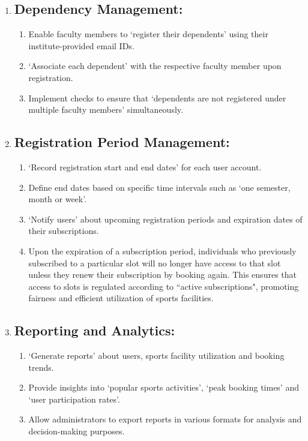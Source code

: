 \documentclass[12pt]{article}
\begin{document}
\begin{enumerate}
    \newpage

    \item[] \subsection{Dependency Management:}
    \begin{enumerate}[label=\alph*)]
        \item Enable faculty members to `register their dependents' using their institute-provided email IDs.
        \item `Associate each dependent' with the respective faculty member upon registration.
        \item Implement checks to ensure that `dependents are not registered under multiple faculty members' simultaneously.
    \end{enumerate}

    \vspace{0.4cm}

    \item[] \subsection{Registration Period Management:}
    \begin{enumerate}[label=\alph*)]
        \item `Record registration start and end dates' for each user account.
        \item Define end dates based on specific time intervals such as `one semester, month or week'.
        \item `Notify users' about upcoming registration periods and expiration dates of their subscriptions.
        \item Upon the expiration of a subscription period, individuals who previously subscribed to a particular slot will no longer have access to that slot unless they renew their subscription by booking again. This ensures that access to slots is regulated according to ``active subscriptions", promoting fairness and efficient utilization of sports facilities.
    \end{enumerate}

    \vspace{0.4cm}

    \item[] \subsection{Reporting and Analytics:}
    \begin{enumerate}[label=\alph*)]
        \item `Generate reports' about users, sports facility utilization and booking trends.
        \item Provide insights into `popular sports activities', `peak booking times' and `user participation rates'.
        \item Allow administrators to export reports in various formats for analysis and decision-making purposes.
    \end{enumerate}
   

\end{enumerate}
\end{document}
